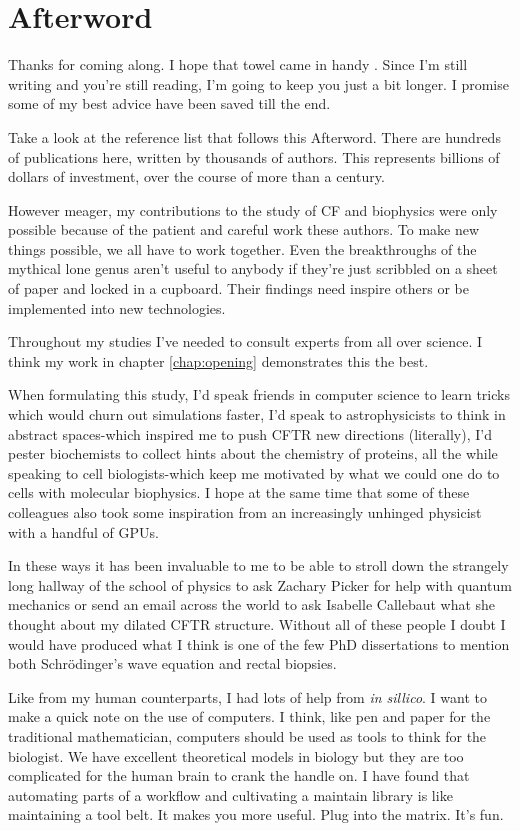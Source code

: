 \chapter{Afterword}
\label{chap:Afterword}
\chapquote {}{}

Thanks for coming along. I hope that towel came in handy \cite{adamd1979}. Since I'm still writing and you're still reading, I'm going to keep you just a bit longer. I promise some of my best advice have been saved till the end. 

Take a look at the reference list that follows this Afterword. There are hundreds of publications here, written by thousands of authors. This represents billions of dollars of investment, over the course of more than a century. 

However meager, my contributions to the study of CF and biophysics were only possible because of the patient and careful work these authors. To make new things possible, we all have to work together. Even the breakthroughs of the mythical lone genus aren't useful to anybody if they're just scribbled on a sheet of paper and locked in a cupboard. Their findings need inspire others or be implemented into new technologies.

Throughout my studies I've needed to consult experts from all over science. I think my work in chapter \ref{chap:opening} demonstrates this the best. 

When formulating this study, I'd speak friends in computer science to learn tricks which would churn out simulations faster, I'd speak to astrophysicists to think in abstract spaces-which inspired me to push CFTR new directions (literally), I'd pester biochemists to collect hints about the chemistry of proteins, all the while speaking to cell biologists-which keep me motivated by what we could one do to cells with molecular biophysics. I hope at the same time that some of these colleagues also took some inspiration from an increasingly unhinged physicist with a handful of GPUs. 

In these ways it has been invaluable to me to be able to stroll down the strangely long hallway of the school of physics to ask Zachary Picker for help with quantum mechanics or send an email across the world to ask Isabelle Callebaut what she thought about my dilated CFTR structure. Without all of these people I doubt I would have produced what I think is one of the few PhD dissertations to mention both Schr\"odinger's wave equation and rectal biopsies. 

Like from my human counterparts, I had lots of help from \textit{in sillico}.  I want to make a quick note on the use of computers. I think, like pen and paper for the traditional mathematician, computers should be used as tools to think for the biologist. We have excellent theoretical models in biology but they are too complicated for the human brain to crank the handle on. I have found that automating parts of a workflow and cultivating a maintain library is like maintaining a tool belt. It makes you more useful. Plug into the matrix. It's fun.

